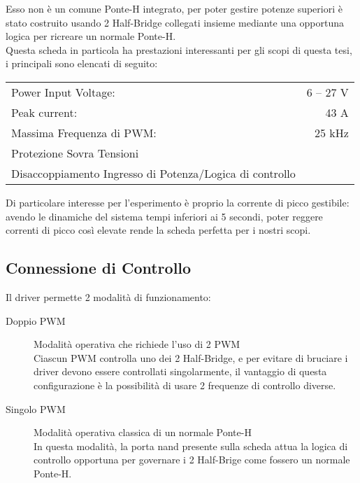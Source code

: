\noindent
Esso non è un comune Ponte-H integrato, per poter gestire potenze superiori è stato costruito usando 2 Half-Bridge collegati insieme mediante una opportuna logica per ricreare un normale Ponte-H.\\
Questa scheda in particola ha prestazioni interessanti per gli scopi di questa tesi, i principali sono elencati di seguito:\vspace{-8mm}
\begin{center}
	\begin{tabular}[t]{|l r|}
		\hline
		Power Input Voltage:                                     & 6 -- 27 V \\
		Peak current:                                            & 43 A      \\
		Massima Frequenza di PWM:                                & 25 kHz    \\
		Protezione Sovra Tensioni                                &           \\
		Disaccoppiamento Ingresso di Potenza/Logica di controllo &           \\
		\hline
	\end{tabular}
\end{center}
\noindent
Di particolare interesse per l'esperimento è proprio la corrente di picco gestibile:
avendo le dinamiche del sistema tempi inferiori ai 5 secondi, poter reggere correnti di picco così elevate rende
la scheda perfetta per i nostri scopi.

\subsection{Connessione di Controllo}
Il driver permette 2 modalità di funzionamento:
\begin{description}
	\item[Doppio PWM] Modalità operativa che richiede l'uso di 2 PWM\\
	      Ciascun PWM controlla uno dei 2 Half-Bridge, e per evitare di bruciare i driver devono essere controllati singolarmente, il vantaggio di questa configurazione è la possibilità di usare 2 frequenze di controllo diverse.
	\item[Singolo PWM] Modalità operativa classica di un normale Ponte-H\\
	      In questa modalità, la porta nand presente sulla scheda attua la logica di controllo opportuna per governare i 2 Half-Brige come fossero un normale Ponte-H.
\end{description}

